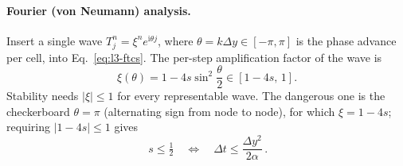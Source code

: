 \paragraph{Fourier (von Neumann) analysis.} Insert a single wave $T_j^n=\xi^n e^{\mathrm{i}\theta j}$, where $\theta=k\Delta y\in[-\pi,\pi]$ is the phase advance per cell, into Eq.~\eqref{eq:l3-ftcs}. The per-step amplification factor of the wave is
\begin{equation}
\xi(\theta)=1-4s\sin^2\!\frac{\theta}{2}\in[1-4s,\,1].
\label{eq:l3-vn}
\end{equation}
Stability needs $|\xi|\le1$ for every representable wave. The dangerous one is the checkerboard $\theta=\pi$ (alternating sign from node to node), for which $\xi=1-4s$; requiring $|1-4s|\le1$ gives
\begin{equation}
\boxed{\,s\le\tfrac12\quad\Longleftrightarrow\quad\Delta t\le\frac{\Delta y^2}{2\alpha}\,}.
\label{eq:l3-bound}
\end{equation}

